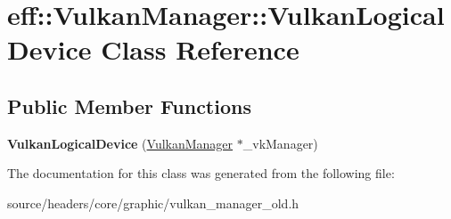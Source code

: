 \hypertarget{classeff_1_1VulkanManager_1_1VulkanLogicalDevice}{}\section{eff\+:\+:Vulkan\+Manager\+:\+:Vulkan\+Logical\+Device Class Reference}
\label{classeff_1_1VulkanManager_1_1VulkanLogicalDevice}
\subsection*{Public Member Functions}
\begin{DoxyCompactItemize}
\item 
\mbox{\label{classeff_1_1VulkanManager_1_1VulkanLogicalDevice_a5215ba64660ecbc4bf4adc93a9b42b14}} 
{\bfseries Vulkan\+Logical\+Device} (\mbox{\hyperlink{classeff_1_1VulkanManager}{Vulkan\+Manager}} $\ast$\+\_\+vk\+Manager)
\end{DoxyCompactItemize}


The documentation for this class was generated from the following file\+:\begin{DoxyCompactItemize}
\item 
source/headers/core/graphic/vulkan\+\_\+manager\+\_\+old.\+h\end{DoxyCompactItemize}
